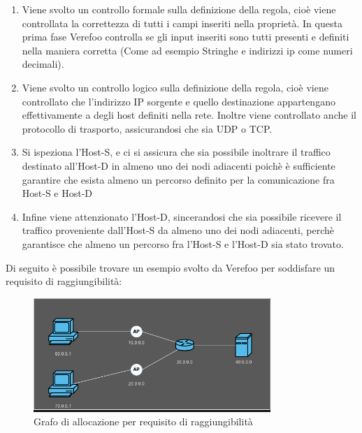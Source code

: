 \begin{enumerate}
    \item  Viene svolto un controllo formale sulla definizione della regola, cioè viene controllata la correttezza di tutti i campi inseriti nella proprietà. In questa prima fase
        Verefoo controlla se gli input inseriti sono tutti presenti e definiti nella maniera corretta (Come ad esempio Stringhe e indirizzi ip come numeri decimali).
    \item Viene svolto un controllo logico sulla definizione della regola, cioè viene controllato che l'indirizzo IP sorgente e quello destinazione appartengano effettivamente a degli host definiti
        nella rete. Inoltre viene controllato anche il protocollo di trasporto, assicurandosi che sia UDP o TCP.
    \item Si ispeziona l'Host-S, e ci si assicura che sia possibile inoltrare il traffico destinato all'Host-D in almeno uno dei nodi adiacenti poichè è sufficiente garantire che esista almeno un percorso
        definito per la comunicazione fra Host-S e Host-D
    \item Infine viene attenzionato l'Host-D, sincerandosi che sia possibile ricevere il traffico proveniente dall'Host-S da almeno uno dei nodi adiacenti, perchè garantisce che almeno un percorso fra l'Host-S
    e l'Host-D sia stato trovato.
\end{enumerate}

Di seguito è possibile trovare un esempio svolto da Verefoo per soddisfare un requisito di raggiungibilità:\\
\begin{figure}[h]  %
    \centering
    \includegraphics[width=0.8\textwidth]{Reachability.png}  %
    \caption{Grafo di allocazione per requisito di raggiungibilità}
    \label{fig:Reachability}
  \end{figure}

